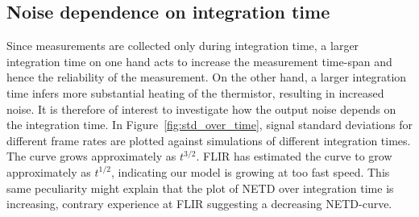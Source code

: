 \subsection{Noise dependence on integration time}
Since measurements are collected only during integration time, a larger integration time on one hand acts to increase the measurement time-span and hence the
reliability of the measurement. On the other hand, a larger integration time infers more substantial heating of the thermistor, resulting in increased noise. It is therefore
of interest to investigate how the output noise depends on the integration time. In Figure~\ref{fig:std_over_time}, signal standard deviations for different frame rates
are plotted against simulations of different integration times. The curve grows approximately as $t^{3/2}$. FLIR has estimated the curve to grow approximately as $t^{1/2}$, indicating
our model is growing at too fast speed. This same peculiarity might explain that the plot of NETD over integration time is increasing, contrary experience at FLIR suggesting
a decreasing NETD-curve.
